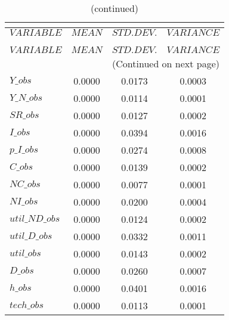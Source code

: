 
\begin{center}
\begin{longtable}{lccc} 
\caption{THEORETICAL MOMENTS}\\
 \label{Table:th_moments}\\
\toprule 
$VARIABLE       $	 & 	 $         MEAN$	 & 	 $    STD. DEV.$	 & 	 $     VARIANCE$\\
\midrule \endfirsthead 
\caption{(continued)}\\
 \toprule \\ 
$VARIABLE       $	 & 	 $         MEAN$	 & 	 $    STD. DEV.$	 & 	 $     VARIANCE$\\
\midrule \endhead 
\midrule \multicolumn{4}{r}{(Continued on next page)} \\ \bottomrule \endfoot 
\bottomrule \endlastfoot 
$Y\_obs         $	 & 	       0.0000	 & 	       0.0173	 & 	       0.0003 \\ 
$Y\_N\_obs      $	 & 	       0.0000	 & 	       0.0114	 & 	       0.0001 \\ 
$SR\_obs        $	 & 	       0.0000	 & 	       0.0127	 & 	       0.0002 \\ 
$I\_obs         $	 & 	       0.0000	 & 	       0.0394	 & 	       0.0016 \\ 
$p\_I\_obs      $	 & 	       0.0000	 & 	       0.0274	 & 	       0.0008 \\ 
$C\_obs         $	 & 	       0.0000	 & 	       0.0139	 & 	       0.0002 \\ 
$NC\_obs        $	 & 	       0.0000	 & 	       0.0077	 & 	       0.0001 \\ 
$NI\_obs        $	 & 	       0.0000	 & 	       0.0200	 & 	       0.0004 \\ 
$util\_ND\_obs  $	 & 	       0.0000	 & 	       0.0124	 & 	       0.0002 \\ 
$util\_D\_obs   $	 & 	       0.0000	 & 	       0.0332	 & 	       0.0011 \\ 
$util\_obs      $	 & 	       0.0000	 & 	       0.0143	 & 	       0.0002 \\ 
$D\_obs         $	 & 	       0.0000	 & 	       0.0260	 & 	       0.0007 \\ 
$h\_obs         $	 & 	       0.0000	 & 	       0.0401	 & 	       0.0016 \\ 
$tech\_obs      $	 & 	       0.0000	 & 	       0.0113	 & 	       0.0001 \\ 
\end{longtable}
 \end{center}
